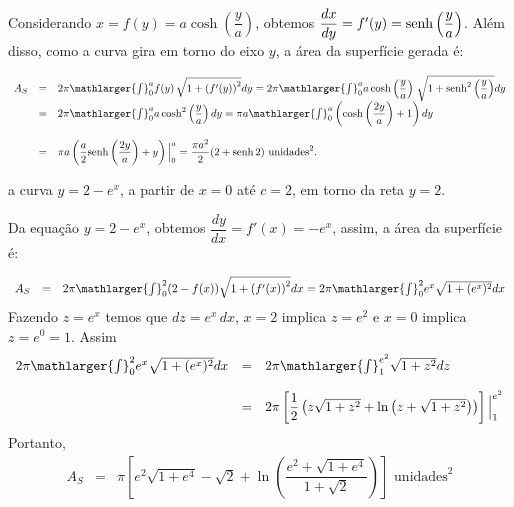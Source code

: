 \cleardoublepage\documentclass[../main.tex]{subfiles}
\begin{document}
\begin{ex}
\begin{compactenum}[a)]
\begin{solution}
Considerando \(x=f(y)=a \cosh\left(\dfrac{y}{a}\right)\), obtemos \(\dfrac{dx}{dy}=f'(y)= {\rm senh} \left(\dfrac{y}{a}\right)\). Além disso, como a curva gira em torno do eixo \(y\), a área da superfície gerada é:

\[ \begin{array}{rcl} A_S&=& 2\pi \mathlarger{\int}^{a}_{0} f(y)\,\sqrt{ 1+ \left(f'(y)\right)^2} dy= 2\pi \mathlarger{\int}^{a}_{0} a \cosh\left(\dfrac{y}{a}\right) \,\sqrt{ 1+ {\rm senh}^2 \left(\dfrac{y}{a}\right)} dy\\ &=& 2\pi \mathlarger{\int}^{a}_{0} a \cosh^2\left(\dfrac{y}{a}\right) dy = \pi a \mathlarger{\int}^{a}_{0} \left(\cosh\left(\dfrac{2y}{a}\right)+ 1 \right) dy \\ \\ &=& \pi a \left(\dfrac{a}{2} {\rm senh}\left(\dfrac{2y}{a}\right)+ y\right) \Big{|}^a_0=\dfrac{\pi a^2}{2}(2+{\rm senh}\,2)\mbox{ unidades}^2. \end{array} \]
\end{solution}
\item a curva \(y=2-e^x\), a partir de \(x=0\) até \(c=2\), em torno da reta \(y=2\).

\begin{solution}
Da equação \(y=2-e^x\), obtemos \(\dfrac{dy}{dx}=f'(x)=-e^x\), assim, a área da superfície é:

\[ \begin{array}{rcl} A_S &=& 2\pi \mathlarger{\int}^{2}_{0} (2-f(x))\sqrt{ 1+ \left(f'(x)\right)^2} dx = 2\pi \mathlarger{\int}^{2}_{0} e^x\sqrt{ 1+ (e^x)^2} dx \end{array} \] Fazendo $z=e^x$ temos que $dz=e^x\,dx$, $x=2$ implica $z=e^2$ e $x=0$ implica $z=e^0=1$. Assim \[ \begin{array}{rcl} 2\pi \mathlarger{\int}^{2}_{0} e^x\sqrt{ 1+ (e^x)^2} dx &=& 2\pi \mathlarger{\int}^{e^2}_{1} \sqrt{ 1+ z^2} dz \\ \\ &=& 2\pi \left[ \dfrac{1}{2} \left(z\sqrt{1+z^2} + \ln \left( z+\sqrt{1+z^2} \right) \right) \right] \Big{|}^{e^2}_{1} \end{array} \] Portanto, \[ \begin{array}{rcl} A_S&=&\pi \left[ e^2\sqrt{1+e^4} -\sqrt{2} + \ln \left( \dfrac{e^2+\sqrt{1+e^4}}{1+\sqrt{2}} \right) \right] \mbox{ unidades}^2 \end{array} \]
\end{solution}
\end{compactenum}
\end{ex}
\end{document}
